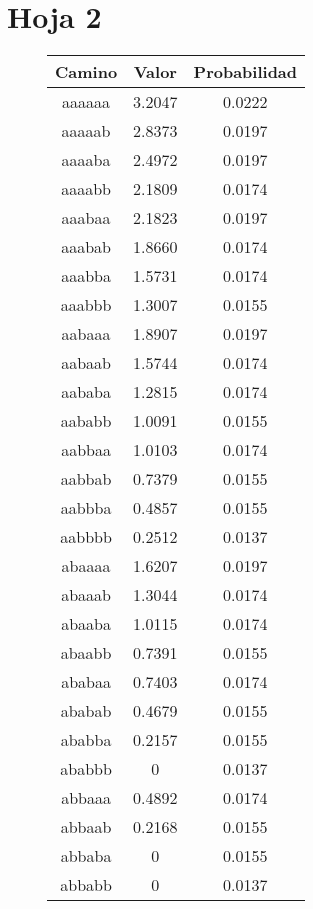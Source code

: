 \section{Hoja 2}

\begin{figure}[hbpt]
\begin{minipage}{0.48\textwidth}
\begin{center}
\begin{tabular}{|c|c|c|}
\hline
\textbf{Camino} & \textbf{Valor} & \textbf{Probabilidad} \\
\hline
aaaaaa  &  3.2047  &  0.0222  \\
aaaaab  &  2.8373  &  0.0197  \\
aaaaba  &  2.4972  &  0.0197  \\
aaaabb  &  2.1809  &  0.0174  \\
aaabaa  &  2.1823  &  0.0197  \\
aaabab  &  1.8660  &  0.0174  \\
aaabba  &  1.5731  &  0.0174  \\
aaabbb  &  1.3007  &  0.0155  \\
aabaaa  &  1.8907  &  0.0197  \\
aabaab  &  1.5744  &  0.0174  \\
aababa  &  1.2815  &  0.0174  \\
aababb  &  1.0091  &  0.0155  \\
aabbaa  &  1.0103  &  0.0174  \\
aabbab  &  0.7379  &  0.0155  \\
aabbba  &  0.4857  &  0.0155  \\
aabbbb  &  0.2512  &  0.0137  \\
abaaaa  &  1.6207  &  0.0197  \\
abaaab  &  1.3044  &  0.0174  \\
abaaba  &  1.0115  &  0.0174  \\
abaabb  &  0.7391  &  0.0155  \\
ababaa  &  0.7403  &  0.0174  \\
ababab  &  0.4679  &  0.0155  \\
ababba  &  0.2157  &  0.0155  \\
ababbb  & 0 &  0.0137  \\
abbaaa  &  0.4892  &  0.0174  \\
abbaab  &  0.2168  &  0.0155  \\
abbaba  & 0 &  0.0155  \\
abbabb  & 0 &  0.0137  \\

\end{tabular}
\end{center}
\end{minipage}
\end{figure}
